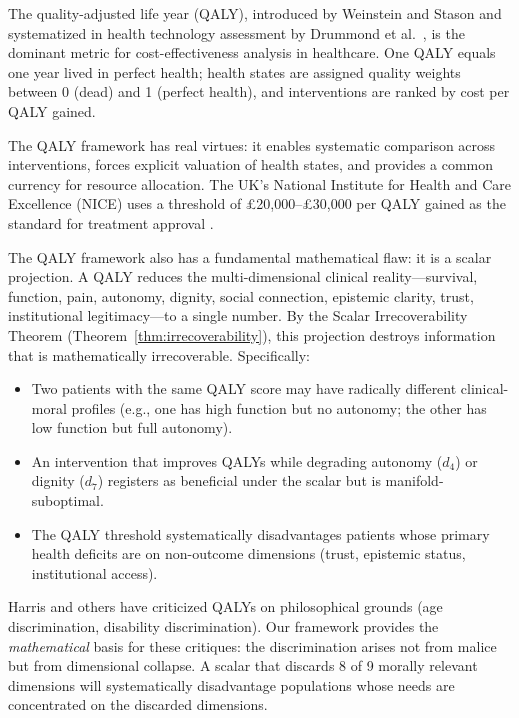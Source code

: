 \documentclass[12pt]{article}
\theoremstyle{definition}
\theoremstyle{remark}
\begin{document}
The quality-adjusted life year (QALY), introduced by Weinstein and Stason \cite{weinstein1977} and systematized in health technology assessment by Drummond et al.\ \cite{drummond2015}, is the dominant metric for cost-effectiveness analysis in healthcare.  One QALY equals one year lived in perfect health; health states are assigned quality weights between 0 (dead) and 1 (perfect health), and interventions are ranked by cost per QALY gained.

The QALY framework has real virtues: it enables systematic comparison across interventions, forces explicit valuation of health states, and provides a common currency for resource allocation.  The UK's National Institute for Health and Care Excellence (NICE) uses a threshold of \pounds20,000--\pounds30,000 per QALY gained as the standard for treatment approval \cite{nice2013}.

The QALY framework also has a fundamental mathematical flaw: it is a scalar projection.  A QALY reduces the multi-dimensional clinical reality---survival, function, pain, autonomy, dignity, social connection, epistemic clarity, trust, institutional legitimacy---to a single number.  By the Scalar Irrecoverability Theorem (Theorem~\ref{thm:irrecoverability}), this projection destroys information that is mathematically irrecoverable.  Specifically:

\begin{itemize}
    \item Two patients with the same QALY score may have radically different clinical-moral profiles (e.g., one has high function but no autonomy; the other has low function but full autonomy).
    \item An intervention that improves QALYs while degrading autonomy ($d_4$) or dignity ($d_7$) registers as beneficial under the scalar but is manifold-suboptimal.
    \item The QALY threshold systematically disadvantages patients whose primary health deficits are on non-outcome dimensions (trust, epistemic status, institutional access).
\end{itemize}

Harris \cite{harris1987} and others have criticized QALYs on philosophical grounds (age discrimination, disability discrimination).  Our framework provides the \emph{mathematical} basis for these critiques: the discrimination arises not from malice but from dimensional collapse.  A scalar that discards 8 of 9 morally relevant dimensions will systematically disadvantage populations whose needs are concentrated on the discarded dimensions.
\end{document}
